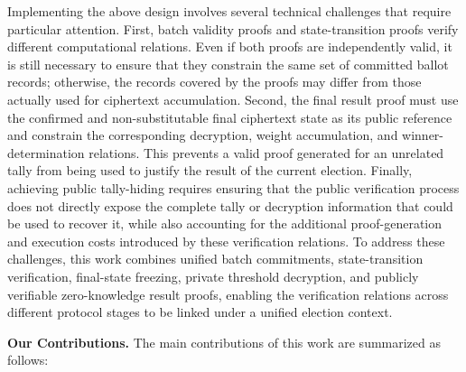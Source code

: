 \documentclass[pdflatex,sn-mathphys-num]{sn-jnl}%
\theoremstyle{thmstyleone}%
\theoremstyle{thmstyletwo}%
\theoremstyle{thmstylethree}%
\begin{document}
Implementing the above design involves several technical challenges that require
particular attention. First, batch validity proofs and state-transition proofs verify
different computational relations. Even if both proofs are independently valid, it is
still necessary to ensure that they constrain the same set of committed ballot records;
otherwise, the records covered by the proofs may differ from those actually used for
ciphertext accumulation. Second, the final result proof must use the confirmed and
non-substitutable final ciphertext state as its public reference and constrain the
corresponding decryption, weight accumulation, and winner-determination relations. This
prevents a valid proof generated for an unrelated tally from being used to justify the
result of the current election. Finally, achieving public tally-hiding requires ensuring
that the public verification process does not directly expose the complete tally or
decryption information that could be used to recover it, while also accounting for the
additional proof-generation and execution costs introduced by these verification
relations. To address these challenges, this work combines unified batch commitments,
state-transition verification, final-state freezing, private threshold decryption, and
publicly verifiable zero-knowledge result proofs, enabling the verification relations
across different protocol stages to be linked under a unified election context.

\noindent\textbf{Our Contributions.} The main contributions of this work are summarized
as follows:
\end{document}
